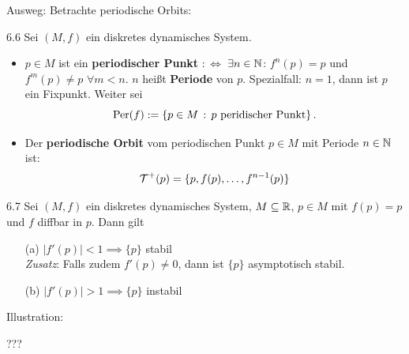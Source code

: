 \documentclass[a4paper]{article}
\begin{document}
Ausweg: Betrachte periodische Orbits:

\begin{Def}{}{6.6}
Sei $(M,f)$ ein diskretes dynamisches System.
\begin{itemize}
\item $p\in M$ ist ein \textbf{periodischer Punkt} $:\iff$ $\exists n\in\operatorname{\mathbb N}$: $f^n(p)=p$ und $f^m(p)\ne p$ $\forall m<n$. $n$ heißt \textbf{Periode} von $p$. Spezialfall: $n=1$, dann ist $p$ ein Fixpunkt. Weiter sei
\[\mathrm{Per}(f):=\{p\in M\,:\,p\text{ peridischer Punkt}\}\,.\]
\item Der \textbf{periodische Orbit} vom periodischen Punkt $p\in M$ mit Periode $n\in\operatorname{\mathbb N}$ ist:
\[\operatorname{\mathcal{T}}^+(p)=\{p,f(p),\ldots,f^{n-1}(p)\}\] 
\end{itemize}
\end{Def}

\begin{Satz}{}{6.7}
Sei $(M,f)$ ein diskretes dynamisches System, $M\subseteq \mathbb R$, $p\in M$ mit $f(p)=p$ und $f$ diffbar in $p$. Dann gilt
\begin{itemize}
\item[(a)] $|f'(p)|<1\implies \{p\}$ stabil\\
\textit{Zusatz}: Falls zudem $f'(p)\ne 0$, dann ist $\{p\}$ asymptotisch stabil.
\item[(b)] $|f'(p)|>1\implies \{p\}$ instabil
\end{itemize}

\end{Satz}
Illustration:
\begin{center}
???
\end{center}
\end{document}
